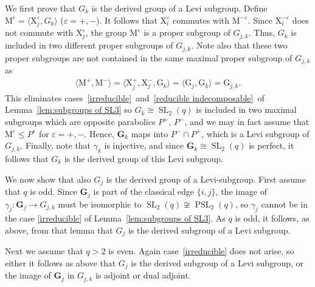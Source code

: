 \documentclass[12pt]{amsart}
\theoremstyle{definition}
\DeclareMathOperator{\SL}{SL}
\DeclareMathOperator{\PSL}{PSL}
\newcommand{\vep}{\varepsilon}
\newcommand{\comp}[1]{{\mathrm{#1}}}
\newcommand{\amgrpG}{{\mathbf{G}}}
\newcommand{\compG}{{{G}}}
\begin{document}
We first prove that $\compG_k$ is the derived group of a Levi subgroup.
Define $\comp{M}^\vep=\langle \comp{X}_{j}^\vep, \compG_{k}\rangle$ ($\vep=+,-$).
It follows that $\comp{X}_{i}^{\vep}$ commutes with $\comp{M}^{-\vep}$. Since $\comp{X}_{i}^{-\vep}$ does not commute with $\comp{X}_{j}^{\vep}$, the group $\comp{M}^\vep$ is a proper subgroup of $\compG_{j,k}$. 
Thus, $\compG_{k}$ is included in two different proper subgroups of $\compG_{j,k}$.
Note also that these two proper subgroups are not contained in the same maximal proper subgroup of $\compG_{j,k}$ as
\begin{align*}
\langle \comp{M}^+,\comp{M}^-\rangle= 
\langle \comp{X}_j^+,\comp{X}_j^-,\comp{G}_k\rangle 
= \langle \comp{G}_j,\comp{G}_k\rangle=\comp{G}_{j,k}.
\end{align*}
This eliminates cases~\ref{irreducible}~and~\ref{reducible indecomposable}~of Lemma~\ref{lem:subgroups of SL3} so $\compG_k\cong\SL_2(q)$ is included in two maximal subgroups which are opposite parabolics $P^+$, $P^-$, and we may in fact assume that $\comp{M}^\vep\le P^\vep$ for $\vep=+,-$.
Hence, $\amgrpG_{k}$ maps into $P^-\cap P^+$, which is a Levi subgroup of $\compG_{j,k}$.
Finally, note that $\gamma_k$ is injective, 
 and since $\amgrpG_k\cong \SL_2(q)$ is perfect, it follows that $\compG_k$ is the derived group of this Levi subgroup.

We now show that also $\compG_j$ is the derived group of a Levi-subgroup.
First assume that $q$ is odd.
Since $\amgrpG_j$ is part of the classical edge $\{i,j\}$, the image of $\gamma_j\colon \amgrpG_{j}\to \compG_{j,k}$ must be isomorphic to $\SL_2(q)\not\cong \PSL_2(q)$, so $\gamma_j$ cannot be in the case \ref{irreducible} of Lemma~\ref{lem:subgroups of SL3}. As $q$ is odd, it follows, as above, from that lemma that $\compG_j$ is the derived subgroup of a Levi subgroup.

Next we assume that $q>2$ is even. Again case~\ref{irreducible} does not arise, so either it follows as above that $\compG_j$ is the derived subgroup of a Levi subgroup, or the image of $\amgrpG_{j}$ in $\compG_{j,k}$ is adjoint or dual adjoint.
\end{document}
